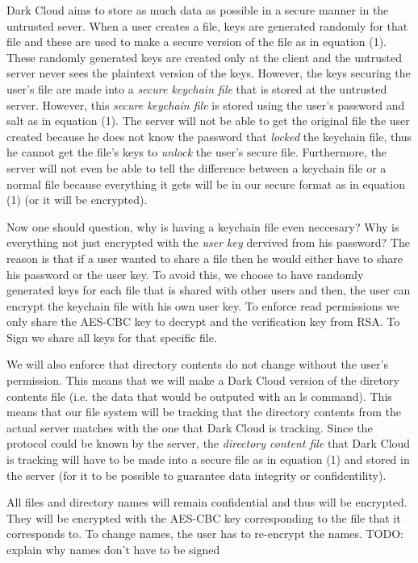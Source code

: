 \documentclass[a4paper]{article}
\begin{document}
	\indent Dark Cloud aims to store as much data as possible in a secure manner in the untrusted sever. 
    When a user creates a file, keys are generated randomly for that file and these are used to make a secure version of the file as in equation (1). 
    These randomly generated keys are created only at the client and the untrusted  server never sees the plaintext version of the keys.
    However, the keys securing the user's file are made into a {\it secure keychain file } that is stored at the untrusted server.
    However, this {\it secure keychain file} is stored using the user's password and salt as in equation (1).
    The server will not be able to get the original file the user created because he does not know the password that {\it locked} the keychain file, thus he cannot get the file's keys to {\it unlock } the user's secure file. 
    Furthermore, the server will not even be able to tell the difference between a keychain file or a normal file because everything it gets will be in our secure format as in equation (1) (or it will be encrypted).
    
    Now one should question, why is having a keychain file even neccesary? Why is everything not just encrypted with the {\it user key} dervived from his password? The reason is that if a user wanted to share a file then he would either have to share his password or the user key. To avoid this, we choose to have randomly generated keys for each file that is shared with other users and then, the user can encrypt the keychain file with his own user key. To enforce read permissions we only share the AES-CBC key to decrypt and the verification key from RSA. To Sign we share all keys for that specific file.
    
    We will also enforce that directory contents do not change without the user's permission. This means that we will make a Dark Cloud version of the diretory contents file (i.e. the data that would be outputed with an ls command). This means that our file system will be tracking that the directory contents from the actual server matches with the one that Dark Cloud is tracking. Since the protocol could be known by the server, the {\it directory content file} that Dark Cloud is tracking will have to be made into a secure file as in equation (1) and stored in the server (for it to be possible to guarantee data integrity or confidentility).
    
    All files and directory names will remain confidential and thus will be encrypted. They will be encrypted with the AES-CBC key corresponding to the file that it corresponds to. To change names, the user has to re-encrypt the names. 
    TODO: explain why names don't have to be signed
    
\end{document}
